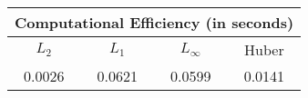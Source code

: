 \begin{tabular}{cccc} \hline \hline 
\multicolumn{4}{c}{Computational Efficiency (in seconds)} \\ \hline \hline
$L_2$ & $L_1$ & $L_\infty$ & Huber \\ \hline 
0.0026 & 0.0621 & 0.0599 & 0.0141  \\ 
\hline 
\end{tabular}